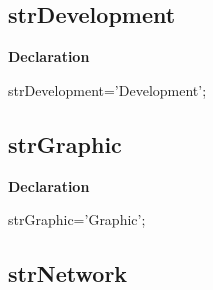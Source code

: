 \documentclass{report}
\newif\ifpdf
\begin{document}
\subsection*{strDevelopment}
\fi
\label{trstrings-strDevelopment}
\begin{list}{}{
\setlength{\itemindent}{0cm}
\setlength{\listparindent}{0cm}
\setlength{\leftmargin}{\evensidemargin}
\addtolength{\leftmargin}{\tmplength}
\settowidth{\labelsep}{X}
\addtolength{\leftmargin}{\labelsep}
\setlength{\labelwidth}{\tmplength}
}
\item[\textbf{Declaration}\hfill]
\ifpdf
\begin{flushleft}
\fi
\begin{ttfamily}
strDevelopment='Development';\end{ttfamily}

\ifpdf
\end{flushleft}
\fi

\end{list}
\ifpdf
\subsection*{\large{\textbf{strGraphic}}\normalsize\hspace{1ex}\hrulefill}
\else
\subsection*{strGraphic}
\fi
\label{trstrings-strGraphic}
\begin{list}{}{
\setlength{\itemindent}{0cm}
\setlength{\listparindent}{0cm}
\setlength{\leftmargin}{\evensidemargin}
\addtolength{\leftmargin}{\tmplength}
\settowidth{\labelsep}{X}
\addtolength{\leftmargin}{\labelsep}
\setlength{\labelwidth}{\tmplength}
}
\item[\textbf{Declaration}\hfill]
\ifpdf
\begin{flushleft}
\fi
\begin{ttfamily}
strGraphic='Graphic';\end{ttfamily}

\ifpdf
\end{flushleft}
\fi

\end{list}
\ifpdf
\subsection*{\large{\textbf{strNetwork}}\normalsize\hspace{1ex}\hrulefill}
\else
\end{document}
